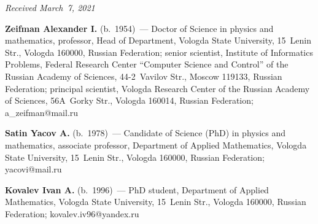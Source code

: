 \vspace*{-9pt}

  \hfill{\small\textit{Received March~7, 2021}}



\vspace*{-14pt}  

\Contr

\vspace*{-2pt}

\noindent
\textbf{Zeifman Alexander I.} (b.\ 1954)~--- Doctor of Science in physics and mathematics,
 professor, Head of Department, Vologda State University, 15~Lenin Str., 
 Vologda 160000, Russian Federation; senior scientist, Institute of Informatics Problems, 
 Federal Research Center ``Computer Science and Control'' 
 of the Russian Academy of Sciences, 44-2~Vavilov Str., Moscow 119133, Russian Federation; 
 principal scientist, Vologda Research Center of the Russian Academy of Sciences, 56A~Gorky Str., 
 Vologda 160014, Russian Federation; \mbox{a\_zeifman@mail.ru}

\vspace*{3pt}

\noindent
\textbf{Satin Yacov A.} (b.\ 1978)~---  
Candidate of Science (PhD) in physics and mathematics, associate professor, Department of Applied Mathematics, 
Vologda State University, 15~Lenin Str., Vologda 160000, Russian Federation; \mbox{yacovi@mail.ru}
 
\vspace*{3pt}

\noindent
\textbf{Kovalev Ivan A.} (b.\ 1996)~---  
PhD student, Department of Applied Mathematics, Vologda State University, 15~Lenin Str., Vologda 160000, 
Russian Federation;  \mbox{kovalev.iv96@yandex.ru}


\label{end\stat}

\renewcommand{\bibname}{\protect\rm Литература}